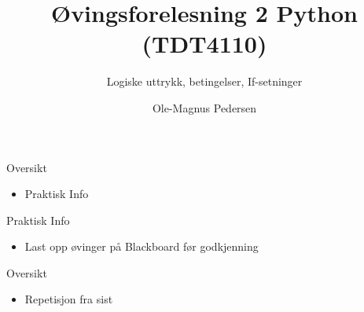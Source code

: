 \documentclass[screen, aspectratio=169]{beamer}
\title[Short title]{Øvingsforelesning 2 Python (TDT4110)}
\subtitle{Logiske uttrykk, betingelser, If-setninger}
\author[Ole-Magnus Pedersen]{Ole-Magnus Pedersen}
\institute[NTNU]{}
\date{}
\begin{document}
\begin{frame}
  \titlepage
\end{frame}


\begin{frame}{Oversikt}
	\begin{itemize}
			\item Praktisk Info
	\end{itemize}
\end{frame}

\begin{frame}{Praktisk Info}
	\begin{itemize}
		\item<+-> Last opp øvinger på Blackboard før godkjenning
	\end{itemize}
\end{frame}

\begin{frame}{Oversikt}
	\begin{itemize}
		\item Repetisjon fra sist
	\end{itemize}
\end{frame}
\end{document}
